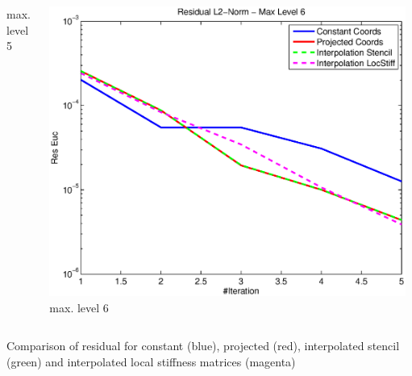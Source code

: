 \documentclass[t,compress=false,usepdftitle=false]{beamer}
\begin{document}
\begin{frame}
\begin{columns}[T]
\begin{column}[T]{4.3cm}
  max. level 5
\end{column}\hfill
\begin{column}[T]{4.3cm} 
  \centering
  \includegraphics[width=0.98\textwidth]{spherestokes_resEuc_level6}\\
  max. level 6
\end{column}
\end{columns}
\vspace{0.5cm}
\centering
Comparison of residual for constant (blue), projected (red), interpolated
stencil (green) and interpolated local stiffness matrices (magenta)
\end{frame}
%
%
%
\end{document}
